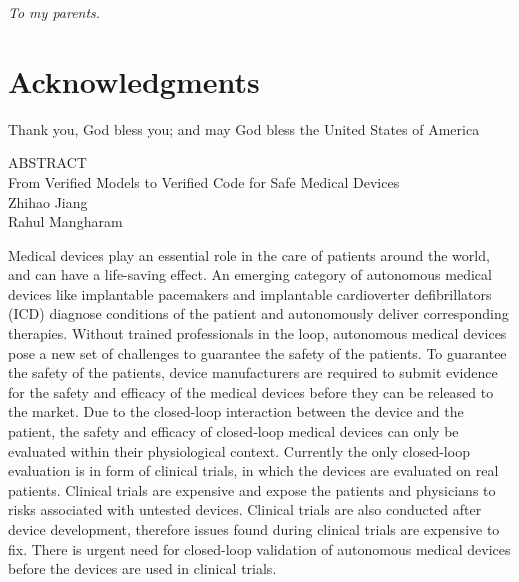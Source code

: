\documentclass[12pt,letterpaper]{report}
\theoremstyle{definition}
\theoremstyle{remark}
\numberwithin{equation}{chapter}
\theoremstyle{plain} %
\def\thetitle{From Verified Models to Verified Code for Safe Medical Devices}
\begin{document}
\newpage
\begin{center}
\vspace*{\fill}
\it{To my parents.}
\vspace*{\fill}
\end{center}


\newpage
{}
{}
\chapter*{Acknowledgments}
%
Thank you, God bless you; and may God bless the United States of America




\newpage
{}
{}
\begin{center}
ABSTRACT\\
$ $\\
\thetitle\\
$ $\\
Zhihao Jiang\\
Rahul Mangharam\\
\end{center}
\noindent Medical devices play an essential role in the care of patients around the world, and can have a life-saving effect.
An emerging category of autonomous medical devices like implantable pacemakers and implantable cardioverter defibrillators (ICD) diagnose conditions of the patient and autonomously deliver corresponding therapies.
Without trained professionals in the loop, autonomous medical devices pose a new set of challenges to guarantee the safety of the patients.
To guarantee the safety of the patients, device manufacturers are required to submit evidence for the safety and efficacy of the medical devices before they can be released to the market.
Due to the closed-loop interaction between the device and the patient, the safety and efficacy of closed-loop medical devices can only be evaluated within their physiological context.
Currently the only closed-loop evaluation is in form of clinical trials, in which the devices are evaluated on real patients.
Clinical trials are expensive and expose the patients and physicians to risks associated with untested devices.
Clinical trials are also conducted after device development, therefore issues found during clinical trials are expensive to fix.
There is urgent need for closed-loop validation of autonomous medical devices before the devices are used in clinical trials.
\end{document}
